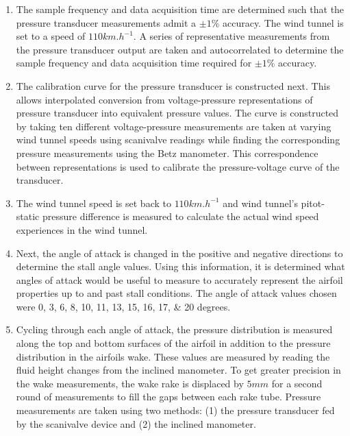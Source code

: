 \documentclass[runningheads]{llncs}
\begin{document}
\begin{enumerate}

    \item The sample frequency and data acquisition time are determined such that the pressure transducer measurements admit a $\pm 1\%$ accuracy. The wind tunnel is set to a speed of $110\si{km.h^{-1}}$. A series of representative measurements from the pressure transducer output are taken and autocorrelated to determine the sample frequency and data acquisition time required for $\pm 1\%$ accuracy.
    
    \item The calibration curve for the pressure transducer is constructed next. This allows interpolated conversion from voltage-pressure representations of pressure transducer into equivalent pressure values. The curve is constructed by taking ten different voltage-pressure measurements are taken at varying wind tunnel speeds using scanivalve readings while finding the corresponding pressure measurements using the Betz manometer. This correspondence between representations is used to calibrate the pressure-voltage curve of the transducer.
    
    \item The wind tunnel speed is set back to $110\si{km.h^{-1}}$ and wind tunnel's pitot-static pressure difference is measured to calculate the actual wind speed experiences in the wind tunnel.
    
    \item Next, the angle of attack is changed in the positive and negative directions to determine the stall angle values. Using this information, it is determined what angles of attack would be useful to measure to accurately represent the airfoil properties up to and past stall conditions. The angle of attack values chosen were \numlist{0;3;6;8;10;11;13;15;16;17;20} degrees.

    \item Cycling through each angle of attack, the pressure distribution is measured along the top and bottom surfaces of the airfoil in addition to the pressure distribution in the airfoils wake. These values are measured by reading the fluid height changes from the inclined manometer. To get greater precision in the wake measurements, the wake rake is displaced by $5\si{mm}$ for a second round of measurements to fill the gaps between each rake tube. Pressure measurements are taken using two methods: (1) the pressure transducer fed by the scanivalve device and (2) the inclined manometer.

\end{enumerate}
\end{document}
